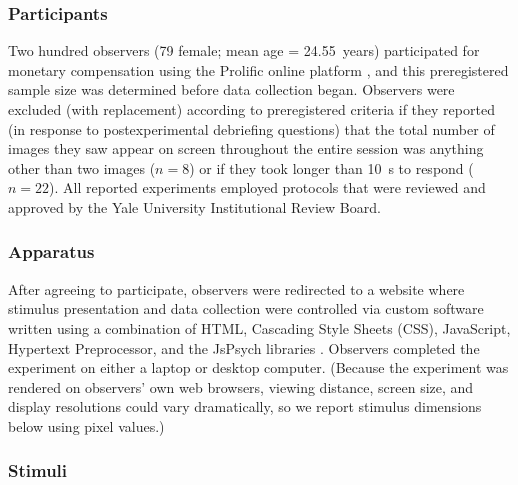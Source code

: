 \subsubsection{Participants}

Two hundred observers (79 female; mean age = 24.55~years) participated for monetary compensation using the Prolific online platform \parencite{palan_prolificacsubject_2018}, and this preregistered sample size was determined before data collection began. Observers were excluded (with replacement) according to preregistered criteria if they reported (in response to postexperimental debriefing questions) that the total number of images they saw appear on screen throughout the entire session was anything other than two images ($n = 8$) or if they took longer than \qty{10}{\second} to respond ($n = 22$). All reported experiments employed protocols that were reviewed and approved by the Yale University Institutional Review Board.

\subsubsection{Apparatus}

After agreeing to participate, observers were redirected to a website where stimulus presentation and data collection were controlled via custom software written using a combination of HTML, Cascading Style Sheets (CSS), JavaScript, Hypertext Preprocessor, and the JsPsych libraries \parencite{de_leeuw_jspsych_2015}. Observers completed the experiment on either a laptop or desktop computer. (Because the experiment was rendered on observers’ own web browsers, viewing distance, screen size, and display resolutions could vary dramatically, so we report stimulus dimensions below using pixel values.)

\subsubsection{Stimuli}

